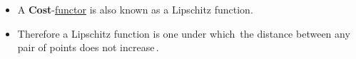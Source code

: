 \begin{itemize}
    \item A \textbf{Cost}-\href{doc/1 math/Seven Sketches in Compositionality/Chapter 2: Resource theories/4 Constructions on V-categories/2 Enriched functors/1 V-functor}{functor} is also known as a Lipschitz function.
    \item Therefore a Lipschitz function is one under which \,the distance between any pair of points does not increase\,.
  \end{itemize}
